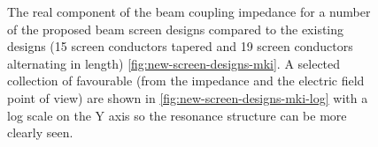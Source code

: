 \begin{figure}
\begin{center}
\end{center}
\caption{The real component of the beam coupling impedance for a number of the proposed beam screen designs compared to the existing designs (15 screen conductors tapered and 19 screen conductors alternating in length) \ref{fig:new-screen-designs-mki}. A selected collection of favourable (from the impedance and the electric field point of view) are shown in \ref{fig:new-screen-designs-mki-log} with a log scale on the Y axis so the resonance structure can be more clearly seen.}
\end{figure}
